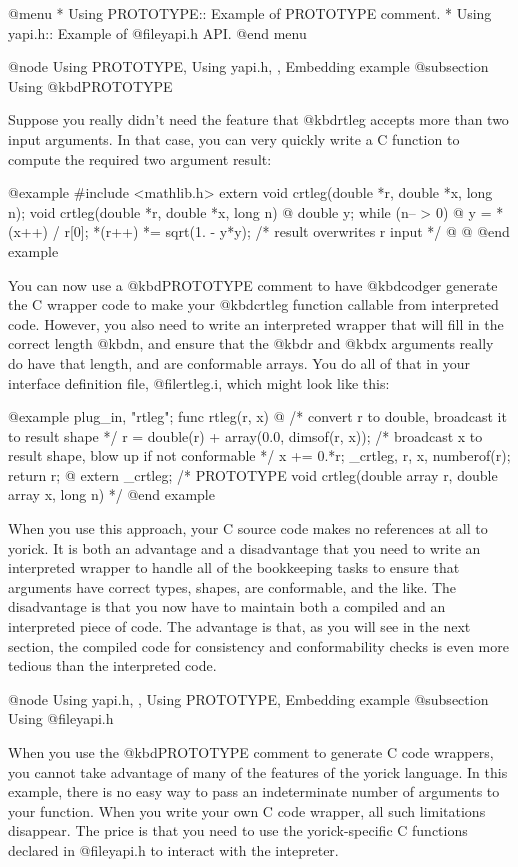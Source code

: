 @menu
* Using PROTOTYPE::             Example of PROTOTYPE comment.
* Using yapi.h::                Example of @file{yapi.h} API.
@end menu

@node Using PROTOTYPE, Using yapi.h, , Embedding example
@subsection Using @kbd{PROTOTYPE}

Suppose you really didn't need the feature that @kbd{rtleg} accepts
more than two input arguments.  In that case, you can very quickly
write a C function to compute the required two argument result:

@example
#include <mathlib.h>
extern void crtleg(double *r, double *x, long n);
void
crtleg(double *r, double *x, long n)
@{
  double y;
  while (n-- > 0) @{
    y = *(x++) / r[0];
    *(r++) *= sqrt(1. - y*y);  /* result overwrites r input */
  @}
@}
@end example

You can now use a @kbd{PROTOTYPE} comment to have @kbd{codger}
generate the C wrapper code to make your @kbd{crtleg} function
callable from interpreted code.  However, you also need to write an
interpreted wrapper that will fill in the correct length @kbd{n}, and
ensure that the @kbd{r} and @kbd{x} arguments really do have that
length, and are conformable arrays.  You do all of that in your
interface definition file, @file{rtleg.i}, which might look like this:

@example
plug_in, "rtleg";
func rtleg(r, x)
@{
  /* convert r to double, broadcast it to result shape */
  r = double(r) + array(0.0, dimsof(r, x));
  /* broadcast x to result shape, blow up if not conformable */
  x += 0.*r;
  _crtleg, r, x, numberof(r);
  return r;
@}
extern _crtleg;
/* PROTOTYPE
   void crtleg(double array r, double array x, long n)
 */
@end example

When you use this approach, your C source code makes no references at
all to yorick.  It is both an advantage and a disadvantage that you
need to write an interpreted wrapper to handle all of the bookkeeping
tasks to ensure that arguments have correct types, shapes, are
conformable, and the like.  The disadvantage is that you now have to
maintain both a compiled and an interpreted piece of code.  The
advantage is that, as you will see in the next section, the compiled
code for consistency and conformability checks is even more tedious
than the interpreted code.

@node Using yapi.h,  , Using PROTOTYPE, Embedding example
@subsection Using @file{yapi.h}

When you use the @kbd{PROTOTYPE} comment to generate C code wrappers,
you cannot take advantage of many of the features of the yorick
language.  In this example, there is no easy way to pass an
indeterminate number of arguments to your function.  When you write
your own C code wrapper, all such limitations disappear.  The price is
that you need to use the yorick-specific C functions declared in
@file{yapi.h} to interact with the intepreter.

